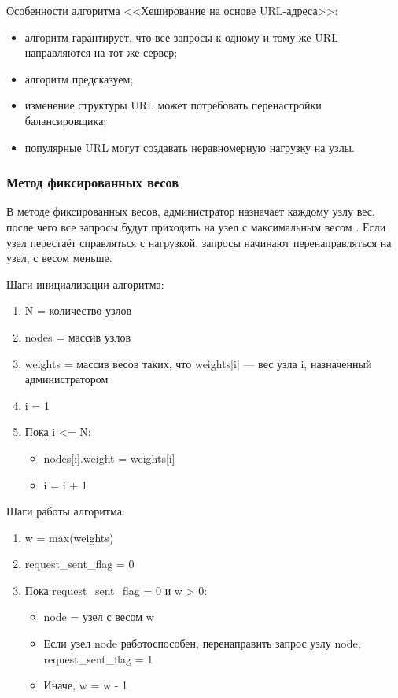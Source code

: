 Особенности алгоритма <<Хеширование на основе URL-адреса>>:
\begin{itemize}
    \item алгоритм гарантирует, что все запросы к одному и тому же URL направляются на тот же сервер;
    \item алгоритм предсказуем;
    \item изменение структуры URL может потребовать перенастройки балансировщика;
    \item популярные URL могут создавать неравномерную нагрузку на узлы.
\end{itemize}

\subsubsection{Метод фиксированных весов}

В методе фиксированных весов, администратор назначает каждому узлу вес, после чего все запросы будут приходить на узел с максимальным весом \cite{kemp}.
Если узел перестаёт справляться с нагрузкой, запросы начинают перенаправляться на узел, с весом меньше.

Шаги инициализации алгоритма:
\begin{enumerate}
    \item N = количество узлов
    \item nodes = массив узлов
    \item weights = массив весов таких, что weights[i] --- вес узла i, назначенный администратором
    \item i = 1
    \item Пока i <= N:
        \begin{itemize}
            \item nodes[i].weight = weights[i]
            \item i = i + 1
        \end{itemize}
\end{enumerate}

Шаги работы алгоритма:
\begin{enumerate}
    \item w = max(weights)
    \item request\_sent\_flag = 0
    \item Пока request\_sent\_flag = 0 и w > 0:
        \begin{itemize}
            \item node = узел с весом w
            \item Если узел node работоспособен, перенаправить запрос узлу node, request\_sent\_flag = 1
            \item Иначе, w = w - 1
        \end{itemize}
\end{enumerate}

